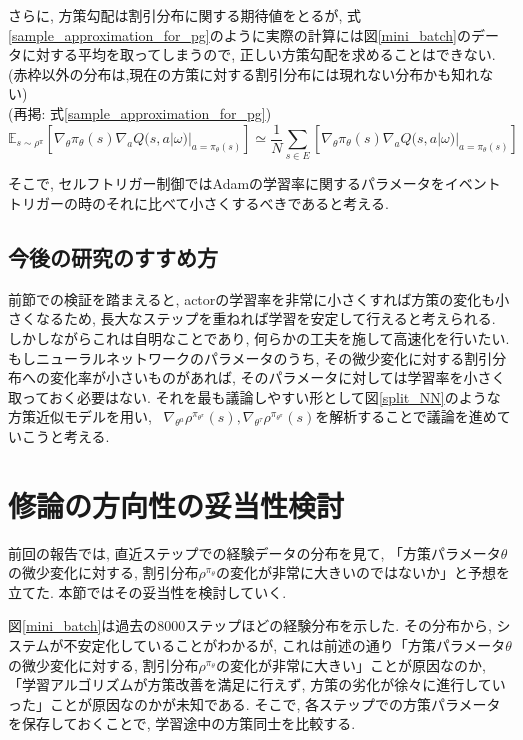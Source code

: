 \documentclass{jsarticle}
\newcommand{\expect}{\mathbb{E}}
\begin{document}
さらに, 方策勾配は割引分布に関する期待値をとるが, 式\eqref{sample_approximation_for_pg}のように実際の計算には図\ref{mini_batch}のデータに対する平均を取ってしまうので, 正しい方策勾配を求めることはできない.(赤枠以外の分布は,現在の方策に対する割引分布には現れない分布かも知れない)\\
(再掲: 式\eqref{sample_approximation_for_pg})
\begin{equation*}
	\expect_{s\sim\rho^{\pi}}[\nabla_{\theta}\pi_{\theta}(s)\nabla_{a}Q(s, a|\omega)|_{a=\pi_{\theta}(s)}] \simeq \frac{1}{N}\sum_{s\in E}[\nabla_{\theta}\pi_{\theta}(s)\nabla_{a}Q(s, a|\omega)|_{a=\pi_{\theta}(s)}] 
\end{equation*}
 \par
そこで, セルフトリガー制御ではAdamの学習率に関するパラメータをイベントトリガーの時のそれに比べて小さくするべきであると考える.\par


\subsection{今後の研究のすすめ方}
前節での検証を踏まえると, actorの学習率を非常に小さくすれば方策の変化も小さくなるため, 長大なステップを重ねれば学習を安定して行えると考えられる. 
しかしながらこれは自明なことであり, 何らかの工夫を施して高速化を行いたい. もしニューラルネットワークのパラメータのうち, その微少変化に対する割引分布への変化率が小さいものがあれば, そのパラメータに対しては学習率を小さく取っておく必要はない. それを最も議論しやすい形として図\ref{split_NN}のような方策近似モデルを用い, ~$\nabla_{\theta^a}\rho^{\pi_{\theta^{\pi}}}(s), \nabla_{\theta^{\tau}}\rho^{\pi_{\theta^{\pi}}}(s)$を解析することで議論を進めていこうと考える.


\section{修論の方向性の妥当性検討}
前回の報告では, 直近ステップでの経験データの分布を見て, 「方策パラメータ$\theta$の微少変化に対する, 割引分布$\rho^{\pi_{\theta}}$の変化が非常に大きいのではないか」と予想を立てた. 本節ではその妥当性を検討していく.\par
図\ref{mini_batch}は過去の8000ステップほどの経験分布を示した. その分布から, システムが不安定化していることがわかるが, これは前述の通り「方策パラメータ$\theta$の微少変化に対する, 割引分布$\rho^{\pi_{\theta}}$の変化が非常に大きい」ことが原因なのか, 「学習アルゴリズムが方策改善を満足に行えず, 方策の劣化が徐々に進行していった」ことが原因なのかが未知である. そこで, 各ステップでの方策パラメータを保存しておくことで, 学習途中の方策同士を比較する.\par
\end{document}
